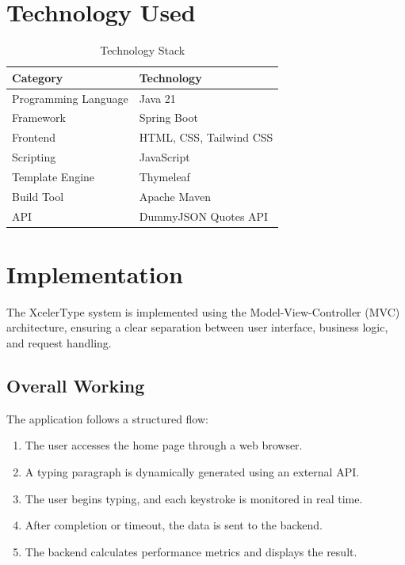 \documentclass[a4paper,12pt]{article}
\begin{document}
\section{Technology Used}

\begin{table}[H]
\centering
\begin{tabular}{ll}
\toprule
\textbf{Category} & \textbf{Technology} \\
\midrule
Programming Language & Java 21 \\
Framework & Spring Boot \\
Frontend & HTML, CSS, Tailwind CSS \\
Scripting & JavaScript \\
Template Engine & Thymeleaf \\
Build Tool & Apache Maven \\
API & DummyJSON Quotes API \\
\bottomrule
\end{tabular}
\caption{Technology Stack}
\end{table}

\section{Implementation}

The XcelerType system is implemented using the Model-View-Controller (MVC) architecture, ensuring a clear separation between user interface, business logic, and request handling.

\subsection{Overall Working}

The application follows a structured flow:

\begin{enumerate}
    \item The user accesses the home page through a web browser.
    \item A typing paragraph is dynamically generated using an external API.
    \item The user begins typing, and each keystroke is monitored in real time.
    \item After completion or timeout, the data is sent to the backend.
    \item The backend calculates performance metrics and displays the result.
\end{enumerate}
\end{document}
